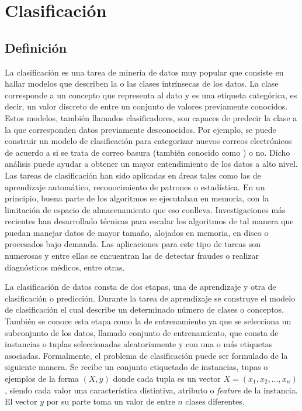 \section{Clasificación}

\subsection{Definición}
\label{clasificacion}

La clasificación es una tarea de minería de datos muy popular que consiste en
hallar modelos que describen la o las clases intrínsecas de los datos. La clase
corresponde a un concepto que representa al dato y es una etiqueta categórica,
es decir, un valor discreto de entre un conjunto de valores previamente
conocidos. Estos modelos, también llamados clasificadores, son capaces de
predecir la clase a la que corresponden datos previamente desconocidos. Por
ejemplo, se puede construir un modelo de clasificación para categorizar nuevos
correos electrónicos  de acuerdo a si se trata de correo basura (también
conocido como ) o no. Dicho análisis puede ayudar a
obtener un mayor entendimiento de los datos a alto nivel. Las tareas de
clasificación han sido aplicadas en áreas tales como las de aprendizaje
automático, reconocimiento de patrones o estadística. En un principio, buena
parte de los algoritmos se ejecutaban en memoria, con la limitación de espacio
de almacenamiento que eso conlleva. Investigaciones más recientes han
desarrollado técnicas para escalar los algoritmos de tal manera que puedan
manejar datos de mayor tamaño, alojados en memoria, en disco o procesados bajo
demanda. Las aplicaciones para este tipo de tareas son numerosas y entre ellas
se encuentran las de detectar fraudes o realizar diagnósticos médicos, entre
otras.

La clasificación de datos consta de dos etapas, una de aprendizaje y otra de
clasificación o predicción. Durante la tarea de aprendizaje se construye el
modelo de clasificación  el cual describe un determinado número de clases o
conceptos. También se conoce esta etapa como la de entrenamiento ya que se
selecciona un subconjunto de los datos, llamado conjunto de entrenamiento, que
consta de instancias o tuplas seleccionadas aleatoriamente y con una o más
etiquetas asociadas. Formalmente, el problema de clasificación puede ser
formulado de la siguiente manera. Se recibe un conjunto etiquetado de
instancias, tupas o ejemplos de la forma $( X, y )$ donde cada tupla es un
vector $X=(x_{1},x_{2},\dots,x_{n})$, siendo cada valor una característica
distintiva, atributo o \textit{feature} de la instancia. El vector $y$ por su parte toma
un valor de entre $n$ clases diferentes.

